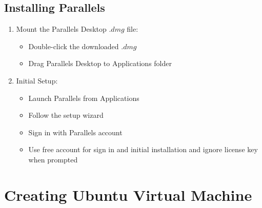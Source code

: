 \documentclass[11pt,a4paper]{article}
\begin{document}
\subsection{Installing Parallels}
\begin{enumerate}
    \item Mount the Parallels Desktop $.dmg$ file:
    \begin{itemize}
        \item Double-click the downloaded $.dmg$
        \item Drag Parallels Desktop to Applications folder
    \end{itemize}
    \item Initial Setup:
    \begin{itemize}
        \item Launch Parallels from Applications
        \item Follow the setup wizard
        \item Sign in with Parallels account
        \item Use free account for sign in and initial installation and ignore license key when prompted
    \end{itemize}
\end{enumerate}

\section{Creating Ubuntu Virtual Machine}
\end{document}
